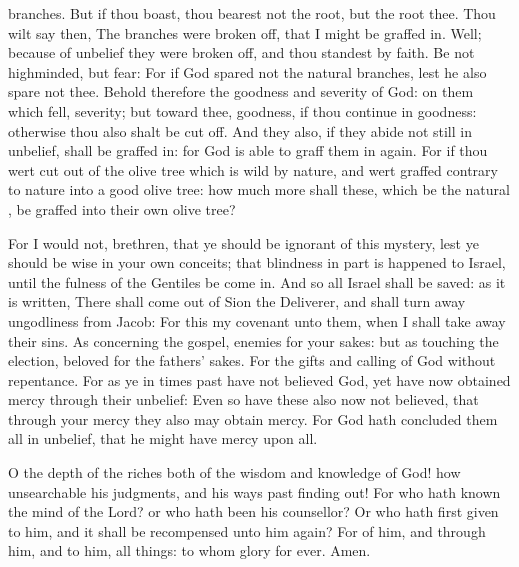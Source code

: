 {branches.
But
if thou
boast,
thou
bearest
not the
root,
but the
root
thee.
Thou wilt
say
then, The
branches were broken
off,
that
I might be graffed
in.
Well; because of
unbelief they were broken
off,
and
thou
standest by
faith.
Be
not
highminded,
but
fear:
For
if
God
spared
not
the
natural
branches,
{}
lest
he
also
spare
not
thee.
Behold
therefore the
goodness
and
severity of
God:
on them which
fell,
severity;
but
toward
thee,
goodness,
if thou
continue
in
{}
goodness:
otherwise
thou
also shalt be cut
off.
And
they
also,
if they
abide
not
still in
unbelief, shall be graffed
in:
for
God
is
able to
graff
them
in
again.
For
if
thou wert cut
out
of the olive tree which is
wild
by
nature,
and wert
graffed contrary
to
nature
into a good olive
tree: how
much
more
shall
these, which
be the
natural
{}, be graffed
into their
own olive
tree?
\par }{\PP {}For I
would
not,
brethren,
that
ye should be ignorant
of
this
mystery,
lest ye should
be
wise
in your own
conceits;
that
blindness
in
part is
happened to
Israel,
until the
fulness of the
Gentiles be come
in.
And
so
all
Israel shall be
saved:
as it is
written, There shall
come out
of
Sion the
Deliverer,
and shall turn
away
ungodliness
from
Jacob:
For
this
{}
my
covenant unto
them,
when I shall take
away
their
sins.
As
concerning the
gospel,
{}
enemies
for
your
sakes:
but as
touching the
election,
{}
beloved
for the
fathers’
sakes.
For the
gifts
and
calling of
God
{} without
repentance.
For
as
ye in times
past have not
believed
God,
yet
have
now obtained
mercy
through
their
unbelief:
Even
so
have
these
also
now not
believed,
that through
your
mercy
they
also may obtain
mercy.
For
God hath
concluded them
all
in
unbelief,
that he might have mercy
upon
all.
\par }{\PP {}O the
depth of the
riches
both of the
wisdom
and
knowledge of
God!
how
unsearchable
{}
his
judgments,
and
his
ways past finding
out!
For
who hath
known the
mind of the
Lord?
or
who hath
been
his
counsellor?
Or
who hath first
given to
him,
and it shall be
recompensed unto
him
again?
For
of
him,
and
through
him,
and
to
him,
{} all
things: to
whom
{}
glory
for
ever.
Amen.

}
